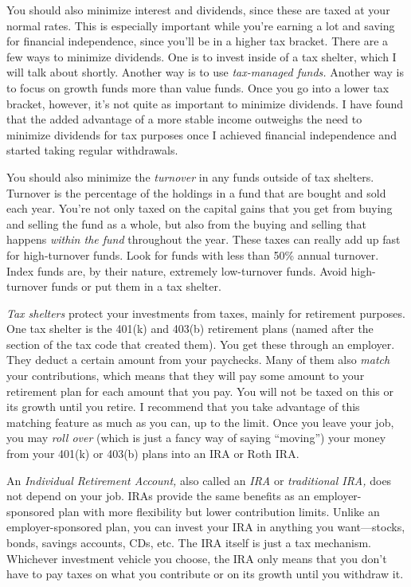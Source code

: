 You should also minimize interest and dividends, since these are taxed at your normal rates. This is especially important while you're earning a lot and saving for financial independence, since you'll be in a higher tax bracket. There are a few ways to minimize dividends. One is to invest inside of a tax shelter, which I will talk about shortly. Another way is to use \emph{tax-managed funds.} Another way is to focus on growth funds more than value funds. Once you go into a lower tax bracket, however, it's not quite as important to minimize dividends. I have found that the added advantage of a more stable income outweighs the need to minimize dividends for tax purposes once I achieved financial independence and started taking regular withdrawals.

You should also minimize the \emph{turnover} in any funds outside of tax shelters. Turnover is the percentage of the holdings in a fund that are bought and sold each year. You're not only taxed on the capital gains that you get from buying and selling the fund as a whole, but also from the buying and selling that happens \emph{within the fund} throughout the year. These taxes can really add up fast for high-turnover funds. Look for funds with less than 50\% annual turnover. Index funds are, by their nature, extremely low-turnover funds. Avoid high-turnover funds or put them in a tax shelter.

\emph{Tax shelters} protect your investments from taxes, mainly for retirement purposes. One tax shelter is the 401(k) and 403(b) retirement plans (named after the section of the tax code that created them). You get these through an employer. They deduct a certain amount from your paychecks. Many of them also \emph{match} your contributions, which means that they will pay some amount to your retirement plan for each amount that you pay. You will not be taxed on this or its growth until you retire. I recommend that you take advantage of this matching feature as much as you can, up to the limit. Once you leave your job, you may \emph{roll over} (which is just a fancy way of saying ``moving'') your money from your 401(k) or 403(b) plans into an IRA or Roth IRA.

An \emph{Individual Retirement Account,} also called an \emph{IRA} or \emph{traditional IRA,} does not depend on your job. IRAs provide the same benefits as an employer-sponsored plan with more flexibility but lower contribution limits. Unlike an employer-sponsored plan, you can invest your IRA in anything you want---stocks, bonds, savings accounts, CDs, etc. The IRA itself is just a tax mechanism. Whichever investment vehicle you choose, the IRA only means that you don't have to pay taxes on what you contribute or on its growth until you withdraw it.

